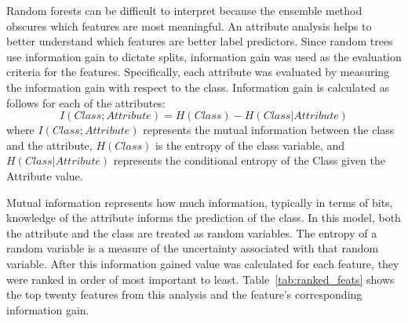 \documentclass{article}
\begin{document}
Random forests can be difficult to interpret because the ensemble method obscures which features are most meaningful.  An attribute analysis helps to better understand which features are better label predictors.  Since random trees use information gain to dictate splits, information gain was used as the evaluation criteria for the features.  Specifically, each attribute was evaluated by measuring the information gain with respect to the class.  Information gain is calculated as follows for each of the attributes:
\begin{equation}
I(Class; Attribute) = H(Class) - H(Class | Attribute)
\end{equation} \label{eq:info_gained}
where $I(Class; Attribute)$ represents the mutual information between the class and the attribute, $H(Class)$ is the entropy of the class variable, and  $H(Class | Attribute)$ represents the conditional entropy of the Class given the Attribute value.  

Mutual information represents how much information, typically in terms of bits, knowledge of the attribute informs the prediction of the class.  In this model, both the attribute and the class are treated as random variables.  The entropy of a random variable is a measure of the uncertainty associated with that random variable. After this information gained value was calculated for each feature, they were ranked in order of most important to least.  Table~\ref{tab:ranked_feats} shows the top twenty features from this analysis and the feature's corresponding information gain.
\end{document}
